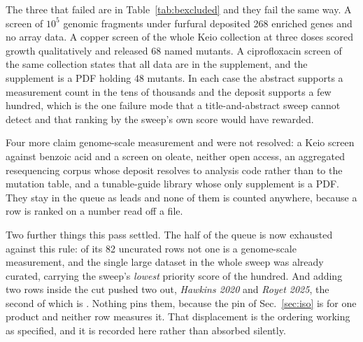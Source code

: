 The three that failed are in Table~\ref{tab:bexcluded} and they fail the same way. A
screen of $10^{5}$ genomic fragments under furfural deposited 268 enriched genes and no
array data. A copper screen of the whole Keio collection at three doses scored growth
qualitatively and released 68 named mutants. A ciprofloxacin screen of the same
collection states that all data are in the supplement, and the supplement is a PDF
holding 48 mutants. In each case the abstract supports a measurement count in the tens
of thousands and the deposit supports a few hundred, which is the one failure mode that
a title-and-abstract sweep cannot detect and that ranking by the sweep's own score would
have rewarded.

Four more claim genome-scale measurement and were not resolved: a Keio screen against
benzoic acid and a screen on oleate, neither open access, an aggregated resequencing
corpus whose deposit resolves to analysis code rather than to the mutation table, and a
tunable-guide library whose only supplement is a PDF. They stay in the queue as leads and
none of them is counted anywhere, because a row is ranked on a number read off a file.

Two further things this pass settled. The  half of the queue is now
exhausted against this rule: of its 82 uncurated rows not one is a genome-scale
measurement, and the single large  dataset in the whole sweep was already
curated, carrying the sweep's \emph{lowest} priority score of the hundred. And adding two
rows inside the cut pushed two out, \emph{Hawkins 2020} and \emph{Royet 2025}, the second
of which is . Nothing pins them, because the pin of Sec.~\ref{sec:iso} is
for one product and neither row measures it. That displacement is the ordering working as
specified, and it is recorded here rather than absorbed silently.


